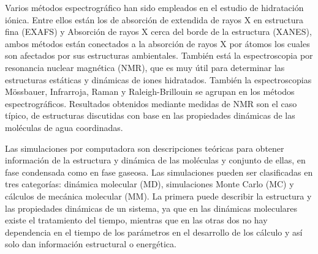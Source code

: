 Varios m\'etodos 
espectrogr\'afico han sido empleados en el estudio de hidrataci\'on
i\'onica. Entre ellos est\'an los de absorci\'on de extendida de 
rayos X en estructura fina (EXAFS) y Absorci\'on de rayos X cerca del
borde de la estructura (XANES), ambos m\'etodos est\'an conectados a
la absorci\'on de rayos X por \'atomos los cuales son afectados por 
sus estructuras ambientales. Tambi\'en est\'a la espectroscopia por
resonancia nuclear magn\'etica (NMR), que es muy \'util para 
determinar las estructuras est\'aticas y din\'amicas de iones 
hidratados. Tambi\'en la espectroscopias M\"ossbauer, Infrarroja, 
Raman y Raleigh-Brillouin se agrupan en los m\'etodos 
espectrogr\'aficos. Resultados obtenidos mediante medidas de NMR son 
el caso t\'ipico, de estructuras discutidas con base en las 
propiedades din\'amicas de las mol\'eculas de agua coordinadas. 

Las simulaciones por 
computadora son descripciones te\'oricas para obtener informaci\'on
de la estructura y din\'amica de las mol\'eculas y conjunto de ellas,
en fase condensada como en fase gaseosa. Las simulaciones pueden ser
clasificadas en tres categor\'ias: din\'amica molecular (MD), 
simulaciones Monte Carlo (MC) y c\'alculos de mec\'anica molecular 
(MM). La primera puede describir la estructura y las propiedades 
din\'amicas de un sistema, ya que en las din\'amicas moleculares 
existe el tratamiento del tiempo, mientras que en las otras dos no 
hay dependencia en el tiempo de los par\'ametros en el desarrollo de 
los c\'alculo y as\'i solo dan informaci\'on estructural o 
energ\'etica.


